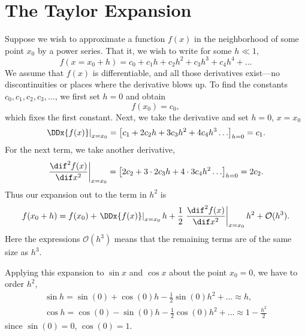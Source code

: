 \section{The Taylor Expansion}\label{s.taylor-expansion}
Suppose we wish to approximate a function $f(x)$ in the neighborhood of some point $x_{0}$ by a power series.  That it, we wish to write for some $h \ll 1$,
\[
 f(x = x_{0}+h) = c_{0} + c_{1} h + c_{2} h^{2} + c_{3} h^{3} + c_{4} h^{4}+ \ldots
\]
We assume that $f(x)$ is differentiable, and all those derivatives exist---no discontinuities or places where the derivative blows up.  To find the constants $c_{0}, c_{1}, c_{2}, c_{3}, \ldots$, we first set $h = 0$ and obtain
\[
	f(x_{0}) = c_{0},
\]
which fixes the first constant.  Next, we take the derivative and set $h = 0$, $x = x_{0}$
\[
\left.\DDx{f(x)}\right|_{x=x_{0}} = \left[c_{1} + 2c_{2} h + 3 c_{3}h^{2} + 4 c_{4} h^{3} \ldots\right]_{h= 0} = c_{1}.
\]
For the next term, we take another derivative,
\[
\left.\frac{\dif^{2}f(x)}{\dif x^{2}}\right|_{x=x_{0}} = \left[ 2c_{2} + 3\cdot 2 c_{3} h + 4\cdot 3 c_{4} h^{2}\ldots\right]_{h=0} = 2c_{2}.
\]
Thus our expansion out to the term in $h^{2}$ is
\[
 f(x_{0}+h) = f(x_{0}) + \left.\DDx{f(x)}\right|_{x=x_{0}} h + \frac{1}{2}\left.\frac{\dif^{2}f(x)}{\dif x^{2}}\right|_{x=x_{0}} h^{2} + \mathcal{O}(h^{3}).
\]
Here the expressions $\mathcal{O}(h^{3})$ means that the remaining terms are of the same size as $h^{3}$.


Applying this expansion to $\sin x$ and $\cos x$ about the point $x_{0} = 0$, we have to order $h^{2}$,
\begin{eqnarray}
	\sin h = \sin(0) + \cos(0)h - \frac{1}{2}\sin(0) h^{2} + \ldots 
		\approx h,\label{e.Taylor-sine}\\
	\cos h = \cos(0) - \sin(0) h - \frac{1}{2} \cos(0) h^{2} + \ldots
		\approx 1-\frac{h^{2}}{2}\label{e.Taylor-cosine}
\end{eqnarray}
since $\sin(0) = 0$, $\cos(0) = 1$.


